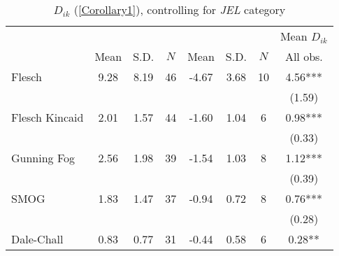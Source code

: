 \begin{table}[H]
    \footnotesize
    \centering
    \begin{threeparttable}
        \caption{\(D_{ik}\) (\autoref{Corollary1}), controlling for \textit{JEL} category}
        \label{table8_jel}
        \begin{tabular}{p{3cm}S[table-format=3.3]@{}S[table-format=3.3]@{}S[table-format=3.2]@{}S[table-format=4.3]@{}S[table-format=3.3]@{}S[table-format=3.1]@{}S@{}}
            \toprule
            &&&{{Mean \(D_{ik}\)}}\\\cmidrule(lr){2-4}\cmidrule(lr){5-7}\cmidrule(lr){8-8}&{{Mean}}&{{S.D.}}&{{\(N\)}}&{{Mean}}&{{S.D.}}&{{\(N\)}}&{{All obs.}}\\
            \midrule
            Flesch                        &        9.28&        8.19&          46&       -4.67&        3.68&          10&        4.56***\\
                                          &            &            &            &            &            &            &      (1.59)   \\
            Flesch Kincaid                &        2.01&        1.57&          44&       -1.60&        1.04&           6&        0.98***\\
                                          &            &            &            &            &            &            &      (0.33)   \\
            Gunning Fog                   &        2.56&        1.98&          39&       -1.54&        1.03&           8&        1.12***\\
                                          &            &            &            &            &            &            &      (0.39)   \\
            SMOG                          &        1.83&        1.47&          37&       -0.94&        0.72&           8&        0.76***\\
                                          &            &            &            &            &            &            &      (0.28)   \\
            Dale-Chall                    &        0.83&        0.77&          31&       -0.44&        0.58&           6&        0.28** \\

\end{tabular}
\end{threeparttable}
\end{table}
